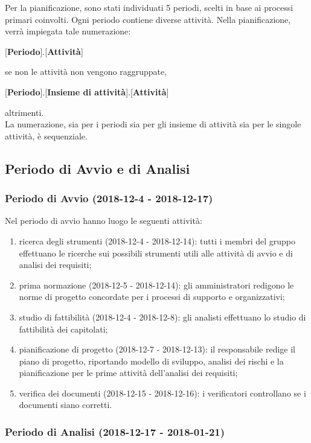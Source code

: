 Per la pianificazione, sono stati individuati 5 periodi, scelti in base ai processi primari coinvolti. Ogni periodo contiene diverse attività. Nella pianificazione, verrà impiegata tale numerazione:
\begin{center}
	[\textbf{Periodo}].[\textbf{Attività}]
\end{center}
se non le attività non vengono raggruppate,
\begin{center}
	[\textbf{Periodo}].[\textbf{Insieme di attività}].[\textbf{Attività}]
\end{center}
altrimenti.\\
La numerazione, sia per i periodi sia per gli insieme di attività sia per le singole attività, è sequenziale.

\subsection{Periodo di Avvio e di Analisi}
	\subsubsection{Periodo di Avvio (2018-12-4 - 2018-12-17)}
		Nel periodo di avvio hanno luogo le seguenti attività:
		\begin{enumerate}[label = 1.\arabic*)]
			\item ricerca degli strumenti (2018-12-4 - 2018-12-14): tutti i membri del gruppo effettuano le ricerche sui possibili strumenti utili alle attività di avvio e di analisi dei requisiti;
			\item prima normazione (2018-12-5 - 2018-12-14): gli amministratori redigono le norme di progetto concordate per i processi di supporto e organizzativi;
			\item studio di fattibilità (2018-12-4 - 2018-12-8): gli analisti effettuano lo studio di fattibilità dei capitolati;
			\item pianificazione di progetto (2018-12-7 - 2018-12-13): il responsabile redige il piano di progetto, riportando modello di sviluppo, analisi dei rischi e la pianificazione per le prime attività dell'analisi dei requisiti;
			\item verifica dei documenti (2018-12-15 - 2018-12-16): i verificatori controllano se i documenti siano corretti.
		\end{enumerate}
	\subsubsection{Periodo di Analisi (2018-12-17 - 2018-01-21)}	
